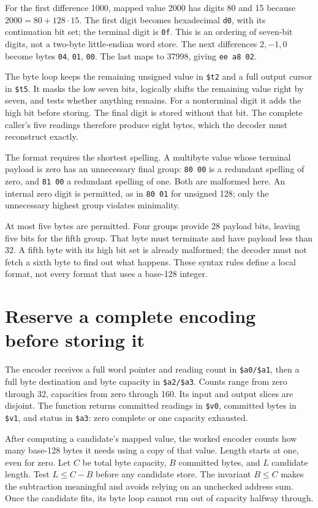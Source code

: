 For the first difference 1000, mapped value 2000 has digits 80 and 15 because
$2000=80+128\cdot15$. The first digit becomes hexadecimal \texttt{d0}, with
its continuation bit set; the terminal digit is \texttt{0f}. This is an
ordering of seven-bit digits, not a two-byte little-endian word store.
The next differences $2,-1,0$ become bytes \texttt{04}, \texttt{01},
\texttt{00}. The last maps to 37998, giving \texttt{ee a8 02}.



The byte loop keeps the remaining unsigned value in \texttt{\$t2} and a full
output cursor in \texttt{\$t5}. It masks the low seven bits, logically shifts
the remaining value right by seven, and tests whether anything remains.
For a nonterminal digit it adds the high bit before storing. The final digit
is stored without that bit. The complete caller's five readings therefore
produce eight bytes, which the decoder must reconstruct exactly.

The format requires the shortest spelling. A multibyte value whose terminal
payload is zero has an unnecessary final group: \texttt{80 00} is a redundant
spelling of zero, and \texttt{81 00} a redundant spelling of one. Both are
malformed here. An internal zero digit is permitted, as in \texttt{80 01}
for unsigned 128; only the unnecessary highest group violates minimality.

At most five bytes are permitted. Four groups provide 28 payload bits, leaving
five bits for the fifth group. That byte must terminate and have payload less
than 32. A fifth byte with its high bit set is already malformed; the decoder
must not fetch a sixth byte to find out what happens. These syntax rules define
a local format, not every format that uses a base-128 integer.

\section{Reserve a complete encoding before storing it}

The encoder receives a full word pointer and reading count in
\texttt{\$a0/\$a1}, then a full byte destination and byte capacity in
\texttt{\$a2/\$a3}. Counts range from zero through 32, capacities from zero
through 160. Its input and output slices are disjoint. The function returns
committed readings in \texttt{\$v0}, committed bytes in \texttt{\$v1}, and
status in \texttt{\$a3}: zero complete or one capacity exhausted.

After computing a candidate's mapped value, the worked encoder counts how many
base-128 bytes it needs using a copy of that value. Length starts at one, even
for zero. Let $C$ be total byte capacity, $B$ committed bytes, and $L$ candidate
length. Test $L\leq C-B$ before any candidate store. The invariant $B\leq C$
makes the subtraction meaningful and avoids relying on an unchecked address sum.
Once the candidate fits, its byte loop cannot run out of capacity halfway through.

